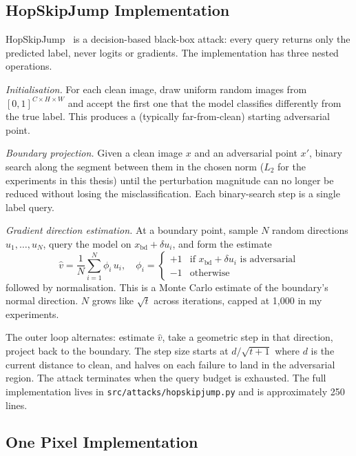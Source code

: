 \subsection{HopSkipJump Implementation}

HopSkipJump~\cite{chen2020hopskipjump} is a decision-based black-box attack: every query returns only the predicted label, never logits or gradients. The implementation has three nested operations.

\textit{Initialisation.} For each clean image, draw uniform random images from $[0, 1]^{C \times H \times W}$ and accept the first one that the model classifies differently from the true label. This produces a (typically far-from-clean) starting adversarial point.

\textit{Boundary projection.} Given a clean image $x$ and an adversarial point $x'$, binary search along the segment between them in the chosen norm ($L_2$ for the experiments in this thesis) until the perturbation magnitude can no longer be reduced without losing the misclassification. Each binary-search step is a single label query.

\textit{Gradient direction estimation.} At a boundary point, sample $N$ random directions $u_1, \dots, u_N$, query the model on $x_{\text{bd}} + \delta u_i$, and form the estimate
\begin{equation}
    \hat{v} = \frac{1}{N} \sum_{i=1}^{N} \phi_i \, u_i, \quad \phi_i = \begin{cases} +1 & \text{if } x_{\text{bd}} + \delta u_i \text{ is adversarial} \\ -1 & \text{otherwise} \end{cases}
\end{equation}
followed by normalisation. This is a Monte Carlo estimate of the boundary's normal direction. $N$ grows like $\sqrt{t}$ across iterations, capped at 1{,}000 in my experiments.

The outer loop alternates: estimate $\hat{v}$, take a geometric step in that direction, project back to the boundary. The step size starts at $d / \sqrt{t+1}$ where $d$ is the current distance to clean, and halves on each failure to land in the adversarial region. The attack terminates when the query budget is exhausted. The full implementation lives in \texttt{src/attacks/hopskipjump.py} and is approximately 250 lines.

\subsection{One Pixel Implementation}

